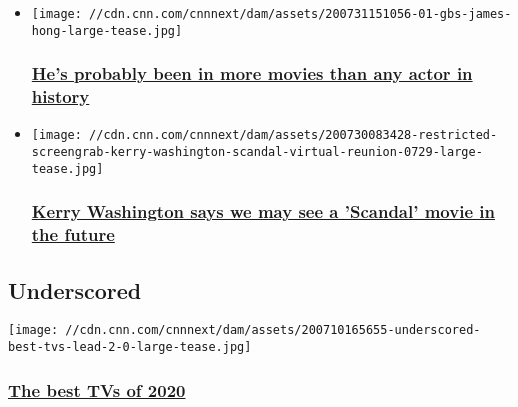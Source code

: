 \begin{itemize}
\item
  \href{/2020/08/02/entertainment/james-hong-actor-movie-credits-trnd/index.html}{}

  \texttt{[image: //cdn.cnn.com/cnnnext/dam/assets/200731151056-01-gbs-james-hong-large-tease.jpg]}

  \hypertarget{hes-probably-been-in-more-movies-than-any-actor-in-history}{%
  \subsubsection{\texorpdfstring{\href{/2020/08/02/entertainment/james-hong-actor-movie-credits-trnd/index.html}{He's
  probably been in more movies than any actor in
  history}}{He's probably been in more movies than any actor in history}}\label{hes-probably-been-in-more-movies-than-any-actor-in-history}}
\item
  \href{/2020/07/30/entertainment/kerry-washington-scandal/index.html}{}

  \texttt{[image: //cdn.cnn.com/cnnnext/dam/assets/200730083428-restricted-screengrab-kerry-washington-scandal-virtual-reunion-0729-large-tease.jpg]}

  \hypertarget{kerry-washington-says-we-may-see-a-scandal-movie-in-the-future}{%
  \subsubsection{\texorpdfstring{\href{/2020/07/30/entertainment/kerry-washington-scandal/index.html}{Kerry
  Washington says we may see a 'Scandal' movie in the
  future}}{Kerry Washington says we may see a 'Scandal' movie in the future}}\label{kerry-washington-says-we-may-see-a-scandal-movie-in-the-future}}
\end{itemize}

\hypertarget{underscored-}{%
\subsection{Underscored~}\label{underscored-}}

\href{/2020/07/10/cnn-underscored/best-tvs-2020/index.html}{}

\texttt{[image: //cdn.cnn.com/cnnnext/dam/assets/200710165655-underscored-best-tvs-lead-2-0-large-tease.jpg]}

\hypertarget{the-best-tvs-of-2020}{%
\subsubsection{\texorpdfstring{\href{/2020/07/10/cnn-underscored/best-tvs-2020/index.html}{The
best TVs of 2020}}{The best TVs of 2020}}\label{the-best-tvs-of-2020}}

